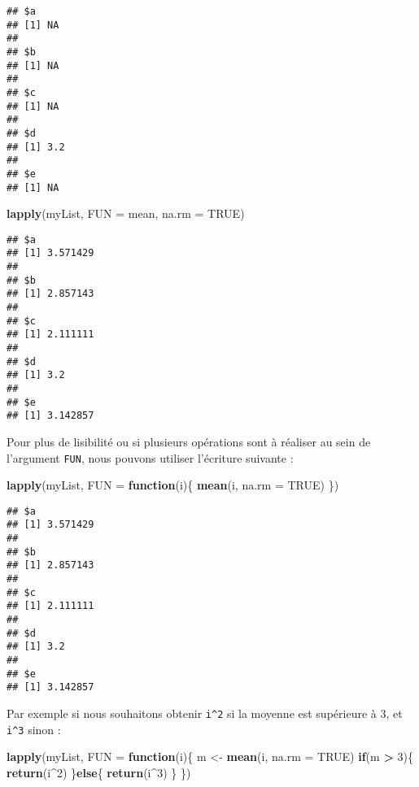\documentclass[]{book}
\newenvironment{Shaded}{\begin{snugshade}}{\end{snugshade}}
\newcommand{\KeywordTok}[1]{\textcolor[rgb]{0.13,0.29,0.53}{\textbf{#1}}}
\newcommand{\DataTypeTok}[1]{\textcolor[rgb]{0.13,0.29,0.53}{#1}}
\newcommand{\DecValTok}[1]{\textcolor[rgb]{0.00,0.00,0.81}{#1}}
\newcommand{\StringTok}[1]{\textcolor[rgb]{0.31,0.60,0.02}{#1}}
\newcommand{\OtherTok}[1]{\textcolor[rgb]{0.56,0.35,0.01}{#1}}
\newcommand{\ControlFlowTok}[1]{\textcolor[rgb]{0.13,0.29,0.53}{\textbf{#1}}}
\newcommand{\OperatorTok}[1]{\textcolor[rgb]{0.81,0.36,0.00}{\textbf{#1}}}
\newcommand{\NormalTok}[1]{#1}
\theoremstyle{definition}
\theoremstyle{definition}
\theoremstyle{definition}
\theoremstyle{remark}
\begin{document}
\begin{verbatim}
## $a
## [1] NA
## 
## $b
## [1] NA
## 
## $c
## [1] NA
## 
## $d
## [1] 3.2
## 
## $e
## [1] NA
\end{verbatim}

\begin{Shaded}
\begin{Highlighting}[]
\KeywordTok{lapply}\NormalTok{(myList, }\DataTypeTok{FUN =}\NormalTok{ mean, }\DataTypeTok{na.rm =} \OtherTok{TRUE}\NormalTok{)}
\end{Highlighting}
\end{Shaded}

\begin{verbatim}
## $a
## [1] 3.571429
## 
## $b
## [1] 2.857143
## 
## $c
## [1] 2.111111
## 
## $d
## [1] 3.2
## 
## $e
## [1] 3.142857
\end{verbatim}

Pour plus de lisibilité ou si plusieurs opérations sont à réaliser au
sein de l'argument \texttt{FUN}, nous pouvons utiliser l'écriture
suivante :

\begin{Shaded}
\begin{Highlighting}[]
\KeywordTok{lapply}\NormalTok{(myList, }\DataTypeTok{FUN =} \ControlFlowTok{function}\NormalTok{(i)\{}
  \KeywordTok{mean}\NormalTok{(i, }\DataTypeTok{na.rm =} \OtherTok{TRUE}\NormalTok{)}
\NormalTok{\})}
\end{Highlighting}
\end{Shaded}

\begin{verbatim}
## $a
## [1] 3.571429
## 
## $b
## [1] 2.857143
## 
## $c
## [1] 2.111111
## 
## $d
## [1] 3.2
## 
## $e
## [1] 3.142857
\end{verbatim}

Par exemple si nous souhaitons obtenir \texttt{i\^{}2} si la moyenne est
supérieure à 3, et \texttt{i\^{}3} sinon :

\begin{Shaded}
\begin{Highlighting}[]
\KeywordTok{lapply}\NormalTok{(myList, }\DataTypeTok{FUN =} \ControlFlowTok{function}\NormalTok{(i)\{}
\NormalTok{  m <-}\StringTok{ }\KeywordTok{mean}\NormalTok{(i, }\DataTypeTok{na.rm =} \OtherTok{TRUE}\NormalTok{)}
  \ControlFlowTok{if}\NormalTok{(m }\OperatorTok{>}\StringTok{ }\DecValTok{3}\NormalTok{)\{}
    \KeywordTok{return}\NormalTok{(i}\OperatorTok{^}\DecValTok{2}\NormalTok{)  }
\NormalTok{  \}}\ControlFlowTok{else}\NormalTok{\{}
    \KeywordTok{return}\NormalTok{(i}\OperatorTok{^}\DecValTok{3}\NormalTok{)}
\NormalTok{  \}}
\NormalTok{\})}
\end{Highlighting}
\end{Shaded}
\end{document}
